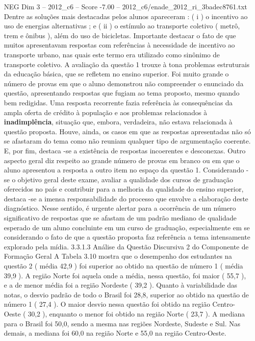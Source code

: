 \begin{textsample}{NEG Dim 3 – 2012\_c6 – Score -7.00 – 2012\_c6/enade\_2012\_ri\_3badec8761.txt}
Dentre as soluções mais destacadas pelos alunos apareceram : ( i ) o incentivo ao uso de energias alternativas ; e ( ii ) o estímulo ao transporte coletivo ( metrô, trem e ônibus ), além do uso de bicicletas.
Importante destacar o fato de que muitos apresentavam respostas com referências à necessidade de incentivo ao transporte urbano, nas quais este termo era utilizado como sinônimo de transporte coletivo.
A avaliação da questão 1 trouxe à tona problemas estruturais da educação básica, que se refletem no ensino superior.
Foi muito grande o número de provas em que o aluno demonstrou não compreender o enunciado da questão, apresentando respostas que fugiam ao tema proposto, mesmo quando bem redigidas.
Uma resposta recorrente fazia referência às consequências da ampla oferta de crédito à população e aos problemas relacionados à \textbf{inadimplência}, situação que, embora, verdadeira, não estava relacionada à questão proposta.
Houve, ainda, os casos em que as respostas apresentadas não só se afastaram do tema como não reuniam qualquer tipo de argumentação coerente.
E, por fim, destaca -se a existência de respostas incoerentes e desconexas.
Outro aspecto geral diz respeito ao grande número de provas em branco ou em que o aluno apresentou a resposta a outro item no espaço da questão 1.
Considerando -se o objetivo geral deste exame, avaliar a qualidade dos cursos de graduação oferecidos no país e contribuir para a melhoria da qualidade do ensino superior, destaca -se a imensa responsabilidade do processo que envolve a elaboração deste diagnóstico.
Nesse sentido, é urgente alertar para a ocorrência de um número significativo de respostas que se afastam de um padrão mediano de qualidade esperado de um aluno concluinte em um curso de graduação, especialmente em se considerando o fato de que a questão proposta faz referência a tema intensamente explorado pela mídia. 3.3.1.3 Análise da Questão Discursiva 2 do Componente de Formação Geral A Tabela 3.10 mostra que o desempenho dos estudantes na questão 2 ( média 42,9 ) foi superior ao obtido na questão de número 1 ( média 39,9 ).
A região Norte foi aquela onde a média, nessa questão, foi maior ( 55,7 ), e a de menor média foi a região Nordeste ( 39,2 ).
Quanto à variabilidade das notas, o desvio padrão de todo o Brasil foi 28,8, superior ao obtido na questão de número 1 ( 27,4 ).
O maior desvio nessa questão foi obtido na região Centro-Oeste ( 30,2 ), enquanto o menor foi obtido na região Norte ( 23,7 ).
A mediana para o Brasil foi 50,0, sendo a mesma nas regiões Nordeste, Sudeste e Sul.
Nas demais, a mediana foi 60,0 na região Norte e 55,0 na região Centro-Oeste.

\end{textsample}
